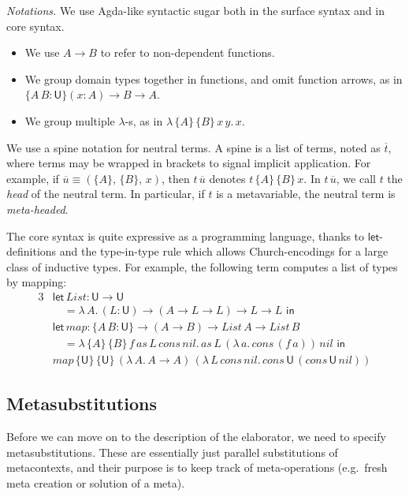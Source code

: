 \documentclass[acmsmall,review,anonymous,prologue,dvipsnames]{acmart}\settopmatter{printfolios=true,printccs=false,printacmref=false}
\newcommand{\slet}{\boldsymbol{\mathsf{let}}}
\renewcommand{\sin}{\boldsymbol{\mathsf{in}}}
\renewcommand{\U}{\mathsf{U}}
\theoremstyle{remark}
\begin{document}
\emph{Notations.} We use Agda-like syntactic sugar both in the surface syntax and
in core syntax.
\begin{itemize}
  \item We use $A \to B$ to refer to non-dependent functions.
  \item We group domain types together in functions, and omit function arrows,
    as in $\{A\,B : \U\}(x : A) \to B \to A$.
  \item We group multiple $\lambda$-s, as in $\lambda\,\{A\}\,\{B\}\,x\,y.\,x$.
\end{itemize}
\begin{definition}[Spines]\label{def:spines}
  We use a spine notation for neutral terms. A spine is a list of
  terms, noted as $\overline{t}$, where terms may be wrapped in brackets to
  signal implicit application. For example, if $\overline{u} \equiv
  (\{A\},\,\{B\},\,x)$, then $t\,\overline{u}$ denotes $t\,\{A\}\,\{B\}\,x$.  In
  $t\,\overline{u}$, we call $t$ the \emph{head} of the neutral term. In
  particular, if $t$ is a metavariable, the neutral term is \emph{meta-headed}.
\end{definition}
\begin{example}
The core syntax is quite expressive as a programming language, thanks to
$\slet$-definitions and the
type-in-type rule which allows Church-encodings for a large class of inductive
types. For example, the following term computes a list of types by mapping:
\begin{alignat*}{3}
  & \slet\,List : \U\to\U\\
  & \hspace{1em}= \lambda\,A.\,(L : \U)\to(A\to L\to L)\to L\to L\,\,\sin\\
  & \slet\,map : \{A\,B : \U\}\to (A \to B) \to List\,A \to List\,B\\
  & \hspace{1em}=
  \lambda\,\{A\}\,\{B\}\,f\,as\,L\,cons\,nil.\,as\,L\,(\lambda\,a.\,cons\,(f\,a))\,nil\,\,\sin\\
  & map\,\{\U\}\,\{\U\}\,(\lambda\,A.\, A \to A)\,(\lambda\,L\,cons\,nil.\,cons\,\U\,(cons\,\U\,nil))
\end{alignat*}
\end{example}

\subsection{Metasubstitutions}\label{sec:metasubstitutions}

Before we can move on to the description of the elaborator, we need to specify
metasubstitutions. These are essentially just parallel substitutions of
metacontexts, and their purpose is to keep track of meta-operations (e.g.\ fresh
meta creation or solution of a meta).
\end{document}
